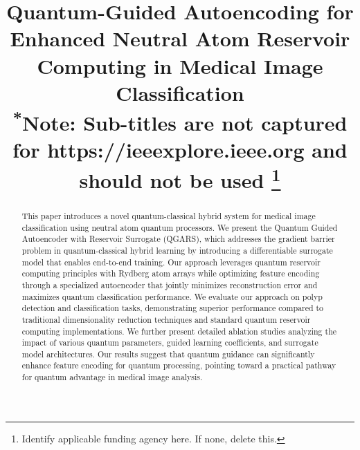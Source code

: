 \documentclass[conference]{IEEEtran}
\begin{document}
\title{Quantum-Guided Autoencoding for Enhanced Neutral Atom Reservoir Computing in Medical Image Classification\\
{\footnotesize \textsuperscript{*}Note: Sub-titles are not captured for https://ieeexplore.ieee.org  and
should not be used}
\thanks{Identify applicable funding agency here. If none, delete this.}
}

\author{

\and
{}
}

\maketitle


\begin{abstract}
This paper introduces a novel quantum-classical hybrid system for medical image classification using neutral atom quantum processors. We present the Quantum Guided Autoencoder with Reservoir Surrogate (QGARS), which addresses the gradient barrier problem in quantum-classical hybrid learning by introducing a differentiable surrogate model that enables end-to-end training. Our approach leverages quantum reservoir computing principles with Rydberg atom arrays while optimizing feature encoding through a specialized autoencoder that jointly minimizes reconstruction error and maximizes quantum classification performance. We evaluate our approach on polyp detection and classification tasks, demonstrating superior performance compared to traditional dimensionality reduction techniques and standard quantum reservoir computing implementations. We further present detailed ablation studies analyzing the impact of various quantum parameters, guided learning coefficients, and surrogate model architectures. Our results suggest that quantum guidance can significantly enhance feature encoding for quantum processing, pointing toward a practical pathway for quantum advantage in medical image analysis.
\end{abstract}
\end{document}
